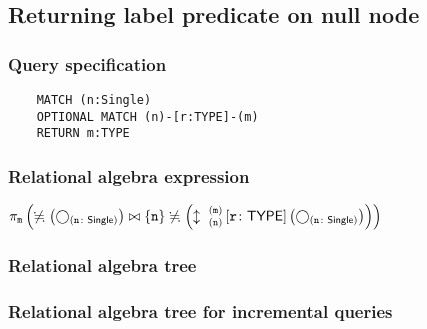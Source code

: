 	\subsection{Returning label predicate on null node}

	\subsubsection*{Query specification}

	\begin{lstlisting}
	MATCH (n:Single)
	OPTIONAL MATCH (n)-[r:TYPE]-(m)
	RETURN m:TYPE
	\end{lstlisting}


	\subsubsection*{Relational algebra expression}

	$\projection{\var{m}} \left(\alldifferent{} \left(\getvertices{n}{Single}\right) \join \{\var{n}\} \alldifferent{} \left(\expandboth{n}{m}{}{r}{TYPE} \left(\getvertices{n}{Single}\right)\right)\right)$

	\subsubsection*{Relational algebra tree}


	\subsubsection*{Relational algebra tree for incremental queries}

